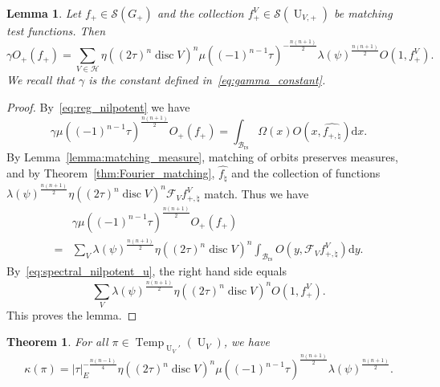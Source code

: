 \documentclass[letterpaper,11pt]{amsart}
\newcommand{\cB}{\mathcal{B}}
\newcommand{\cF}{\mathcal{F}}
\newcommand{\cH}{\mathcal{H}}
\newcommand{\cS}{\mathcal{S}}
\newcommand{\rd}{\mathrm{d}}
\newcommand{\<}{\negthickspace}
\providecommand{\abs}[1]{\lvert#1\rvert}
\DeclareMathOperator{\U}{U}
\DeclareMathOperator{\disc}{disc}
\DeclareMathOperator{\Temp}{Temp} \DeclareMathOperator{\temp}{temp}
\DeclareMathOperator{\rs}{rs}
\theoremstyle{definition}
\theoremstyle{plain}
\newtheorem{theorem}[definition]{Theorem}
\newtheorem{lemma}[definition]{Lemma}
\theoremstyle{remark}
\numberwithin{equation}{section}
\begin{document}
\begin{lemma}   \label{lemma:nilpotent_matching}
Let $f_+ \in \cS(G_+)$ and the collection $f_+^V \in
\cS(\U_{V,+})$ be matching test functions. Then
    \[
    \gamma O_+(f_+) =
    \sum_{V \in \cH} \eta((2\tau)^n \disc V)^n
    \mu((-1)^{n-1} \tau)^{-\frac{n(n+1)}{2}}
    \lambda(\psi)^{\frac{n(n+1)}{2}}
    O(1, f_+^V).
    \]
We recall that $\gamma$ is the constant defined in~\eqref{eq:gamma_constant}.
\end{lemma}

\begin{proof}
By~\eqref{eq:reg_nilpotent} we have
    \[
    \gamma \mu((-1)^{n-1} \tau)^{\frac{n(n+1)}{2}}
    O_+(f_+) =
    \int_{\cB_{\rs}} \Omega(x)
    O(x, \widehat{f_{+, \natural}}) \rd x.
    \]
By Lemma~\ref{lemma:matching_measure}, matching of orbits preserves
measures, and by Theorem~\ref{thm:Fourier_matching}, $\widehat{f_\natural}$
and the collection of functions $\lambda(\psi)^{\frac{n(n+1)}{2}}
\eta((2\tau)^n \disc V)^n \cF_V f^V_{+, \natural}$ match. Thus we have
    \[
    \begin{aligned}
    &\gamma \mu((-1)^{n-1} \tau)^{\frac{n(n+1)}{2}}
    O_+(f_+)\\ = &\sum_V
    \lambda(\psi)^{\frac{n(n+1)}{2}} \eta((2\tau)^n \disc V)^n
     \int_{\cB_{\mathrm{rs}}}
    O(y, \cF_{V} f^V_{+, \natural}) \rd y.
    \end{aligned}
    \]
By~\eqref{eq:spectral_nilpotent_u}, the right hand side equals
    \[
    \sum_V
    \lambda(\psi)^{\frac{n(n+1)}{2}} \eta((2\tau)^n \disc V)^n
    O(1, f_+^V).
    \]
This proves the lemma.
\end{proof}




\begin{theorem} \label{thm:comparison_character}
For all $\pi \in \Temp_{\U_V'}(\U_V)$, we have
    \[
    \kappa(\pi) = \abs{\tau}_E^{-\frac{n(n-1)}{4}}
    \eta((2\tau)^n \disc V)^n
    \mu((-1)^{n-1} \tau)^{\frac{n(n+1)}{2}}
    \lambda(\psi)^{\frac{n(n+1)}{2}}.
    \]
\end{theorem}
\end{document}
